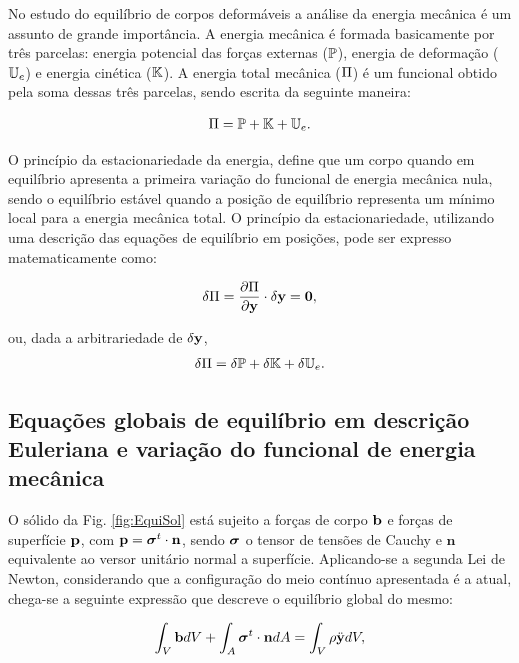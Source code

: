 \documentclass[tese_patricia]{subfiles}
\begin{document}
No estudo do equilíbrio de corpos deformáveis a análise da energia mecânica é um assunto de grande importância. A energia mecânica é formada basicamente por três parcelas: energia potencial das forças externas ($\mathbb{P}$), energia de deformação ($\mathbb{U}_e$) e energia cinética ($\mathbb{K}$). A energia total mecânica ($\Pi$) é um funcional obtido pela soma dessas três parcelas, sendo escrita da seguinte maneira:

\begin{align}
\Pi = \mathbb{P} + \mathbb{K} + \mathbb{U}_e.
\end{align}

O princípio da estacionariedade da energia, define que um corpo quando em equilíbrio apresenta a primeira variação do funcional de energia mecânica nula, sendo o equilíbrio estável quando a posição de equilíbrio representa um mínimo local para a energia mecânica total. O princípio da estacionariedade, utilizando uma descrição das equações de equilíbrio em posições, pode ser expresso matematicamente como:

\begin{align}
\delta\Pi = \frac{\partial{\Pi}}{\partial{\mathbf{y}}} \cdot \delta\mathbf{y} = \mathbf{0}, \label{eq:equilibrio}
\end{align}

\noindent ou, dada a arbitrariedade de $\delta\mathbf{y}$,
\begin{align}
\delta\Pi = \delta\mathbb{P} + \delta\mathbb{K} + \delta\mathbb{U}_e.
\end{align}



\subsection{Equações globais de equilíbrio em descrição Euleriana e variação do funcional de energia mecânica}

O sólido da Fig. \ref{fig:EquiSol} está sujeito a forças de corpo $\mathbf{b}$ e forças de superfície $\mathbf{p}$, com $\mathbf{p} = \boldsymbol{\sigma}^{t} \cdot \mathbf{n}$, sendo $\boldsymbol{\sigma}$ o tensor de tensões de Cauchy e $ \mathbf{n}$ equivalente ao versor unitário normal a superfície. Aplicando-se a segunda Lei de Newton, considerando que a configuração do meio contínuo apresentada é a atual, chega-se a seguinte expressão que descreve o equilíbrio global do mesmo:

\begin{align}
\int_{V} \mathbf{b} dV + \int_{A} \boldsymbol{\sigma}^{t} \cdot \mathbf{n} dA = \int_{V} \rho \ddot{\mathbf{y}} dV, \label{Eq:forSuper}
\end{align}
\end{document}
